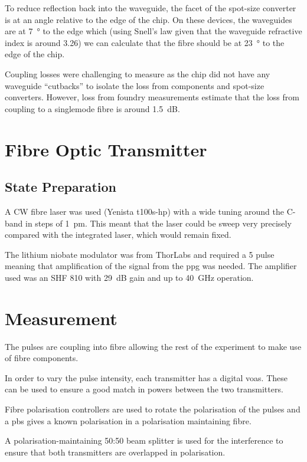 To reduce reflection back into the waveguide, the facet of the spot-size converter is at an angle relative to the edge of the chip. On these devices, the waveguides are at \SI{7}{\degree} to the edge which (using Snell's law given that the waveguide refractive index is around 3.26) we can calculate that the fibre should be at \SI{23}{\degree} to the edge of the chip.

Coupling losses were challenging to measure as the chip did not have any waveguide ``cutbacks'' to isolate the loss from components and spot-size converters.  However, loss from foundry measurements estimate that the loss from coupling to a singlemode fibre is around \SI{1.5}{dB}.

\section{Fibre Optic Transmitter}

\subsection{State Preparation}

A \ac{CW} fibre laser was used (Yenista t100s-hp) with a wide tuning around the C-band in steps of \SI{1}{\pm}. This meant that the laser could be sweep very precisely compared with the integrated laser, which would remain fixed.

The lithium niobate modulator was from ThorLabs and required a \SI{5}{\Vpp} pulse meaning that amplification of the signal from the \ac{ppg} was needed. The amplifier used was an SHF 810 with \SI{29}{dB} gain and up to \SI{40}{\GHz} operation. 


\section{Measurement}

The pulses are coupling into fibre allowing the rest of the experiment to make use of fibre components. 

In order to vary the pulse intensity, each transmitter has a digital \acp{voa}. These can be used to ensure a good match in powers between the two transmitters.

Fibre polarisation controllers are used to rotate the polarisation of the pulses and a \ac{pbs} gives a known polarisation in a polarisation maintaining fibre. 

A polarisation-maintaining {50:50} beam splitter is used for the interference to ensure that both transmitters are overlapped in polarisation.

